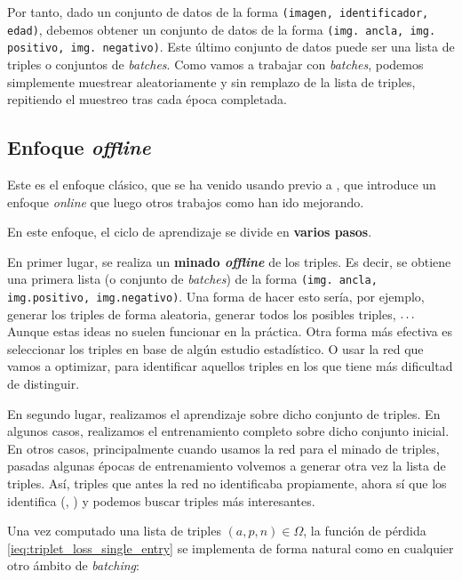Por tanto, dado un conjunto de datos de la forma \lstinline{(imagen, identificador, edad)}, debemos obtener un conjunto de datos de la forma \lstinline{(img. ancla, img. positivo, img. negativo)}. Este último conjunto de datos puede ser una lista de triples o conjuntos de \textit{batches}. Como vamos a trabajar con \textit{batches}, podemos simplemente muestrear aleatoriamente y sin remplazo de la lista de triples, repitiendo el muestreo tras cada época completada.

\subsection{Enfoque \textit{offline}} \label{isubs:enfoque_offline_minado_triples}

Este es el enfoque clásico, que se ha venido usando previo a \cite{informatica:facenet}, que introduce un enfoque \textit{online} que luego otros trabajos como \cite{informatica:principal} han ido mejorando.

En este enfoque, el ciclo de aprendizaje se divide en \textbf{varios pasos}.

En primer lugar, se realiza un \textbf{minado \textit{offline}} de los triples. Es decir, se obtiene una primera lista (o conjunto de \textit{batches}) de la forma \lstinline{(img. ancla, img.positivo, img.negativo)}. Una forma de hacer esto sería, por ejemplo, generar los triples de forma aleatoria, generar todos los posibles triples, $\ldots\ \ $ Aunque estas ideas no suelen funcionar en la práctica. Otra forma más efectiva es seleccionar los triples en base de algún estudio estadístico. O usar la red que vamos a optimizar, para identificar aquellos triples en los que tiene más dificultad de distinguir.

En segundo lugar, realizamos el aprendizaje sobre dicho conjunto de triples. En algunos casos, realizamos el entrenamiento completo sobre dicho conjunto inicial. En otros casos, principalmente cuando usamos la red para el minado de triples, pasadas algunas épocas de entrenamiento volvemos a generar otra vez la lista de triples. Así, triples que antes la red no identificaba propiamente, ahora sí que los identifica (, \cite{informatica:facenet}) y podemos buscar triples más interesantes.

Una vez computado una lista de triples $(a, p, n) \in \Omega$, la función de pérdida \eqref{ieq:triplet_loss_single_entry} se implementa de forma natural como en cualquier otro ámbito de \textit{batching}:

